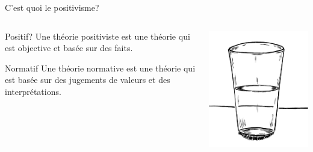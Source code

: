 \documentclass[10pt]{beamer}
\begin{document}
\begin{frame}{C'est quoi le positivisme?}
        \begin{columns}
            \begin{column}{.7\textwidth}
                 {
                \begin{block}{Positif?}
                     {
                    Une théorie positiviste est une théorie qui est objective et basée sur des faits.
                }
                \end{block}
            }
                 {
                \begin{block}{Normatif}
                 {
                    Une théorie normative est une théorie qui est basée sur des jugements de valeurs et des interprétations.
                }
                \end{block}
        }
            \end{column}
            \begin{column}{.3\textwidth}
            \includegraphics[width=\textwidth]{glass}
            \end{column}
        \end{columns}
\end{frame}
\end{document}
